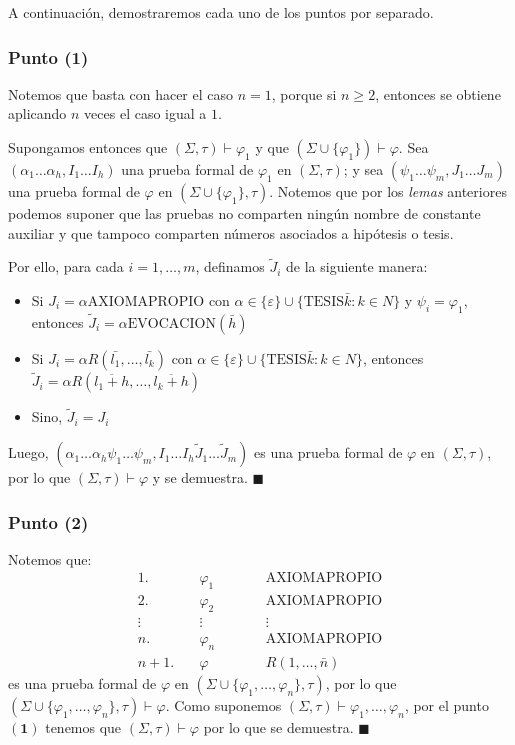 \documentclass{article}
\begin{document}
\vspace{0.4cm}
A continuación, demostraremos cada uno de los puntos por separado.
\subsubsection*{Punto (1)}
Notemos que basta con hacer el caso $n=1$, porque si $n\geq 2$, entonces se obtiene aplicando $n$ veces el caso igual a $1$.

Supongamos entonces que $(\Sigma,\tau)\vdash\varphi_1$ y que $(\Sigma\cup\{\varphi_1\})\vdash\varphi$. Sea $(\alpha_1\dots\alpha_h,I_1\dots I_h)$ una prueba formal de $\varphi_1$ en $(\Sigma,\tau)$; y sea $(\psi_1\dots\psi_m,J_1\dots J_m)$ una prueba formal de $\varphi$ en $(\Sigma\cup\{\varphi_1\},\tau)$. Notemos que por los \textit{lemas} anteriores podemos suponer que las pruebas no comparten ningún nombre de constante auxiliar y que tampoco comparten números asociados a hipótesis o tesis.

Por ello, para cada $i=1,\dots,m$, definamos $\tilde{J}_i$ de la siguiente manera:
\begin{itemize}
  \item Si $J_i=\alpha\text{AXIOMAPROPIO}$ con $\alpha\in\{\varepsilon\}\cup\{\text{TESIS}\bar{k}:k\in N\}$ y $\psi_i=\varphi_1$, entonces $\tilde{J}_i=\alpha\text{EVOCACION}(\bar{h})$
  \item Si $J_i=\alpha R(\bar{l_1},\dots,\bar{l_k})$ con $\alpha\in\{\varepsilon\}\cup\{\text{TESIS}\bar{k}:k\in N\}$, entonces $\tilde{J}_i=\alpha R(\overline{l_1+h},\dots,\overline{l_k+h})$
  \item Sino, $\tilde{J}_i=J_i$
\end{itemize}

Luego, $(\alpha_1\dots\alpha_h\psi_1\dots\psi_m,I_1\dots I_h\tilde{J}_1\dots\tilde{J}_m)$ es una prueba formal de $\varphi$ en $(\Sigma,\tau)$, por lo que $(\Sigma,\tau)\vdash\varphi$ y se demuestra. $\blacksquare$

\subsubsection*{Punto (2)}
Notemos que:
\begin{equation*}
  \begin{alignedat}{2}
    1.     & \quad \varphi_1 &  & \qquad\text{AXIOMAPROPIO} \\
    2.     & \quad \varphi_2 &  & \qquad\text{AXIOMAPROPIO} \\
    \vdots & \quad \vdots    &  & \qquad\vdots              \\
    n.     & \quad \varphi_n &  & \qquad\text{AXIOMAPROPIO} \\
    n+1.   & \quad\varphi    &  & \qquad R(1,\dots,\bar{n})
  \end{alignedat}
\end{equation*}
es una prueba formal de $\varphi$ en $(\Sigma\cup\{\varphi_1,\dots,\varphi_n\},\tau)$, por lo que $(\Sigma\cup\{\varphi_1,\dots,\varphi_n\},\tau)\vdash\varphi$. Como suponemos $(\Sigma,\tau)\vdash\varphi_1,\dots,\varphi_n$, por el punto $\mathbf{(1)}$ tenemos que $(\Sigma,\tau)\vdash\varphi$ por lo que se demuestra. $\blacksquare$
\end{document}
